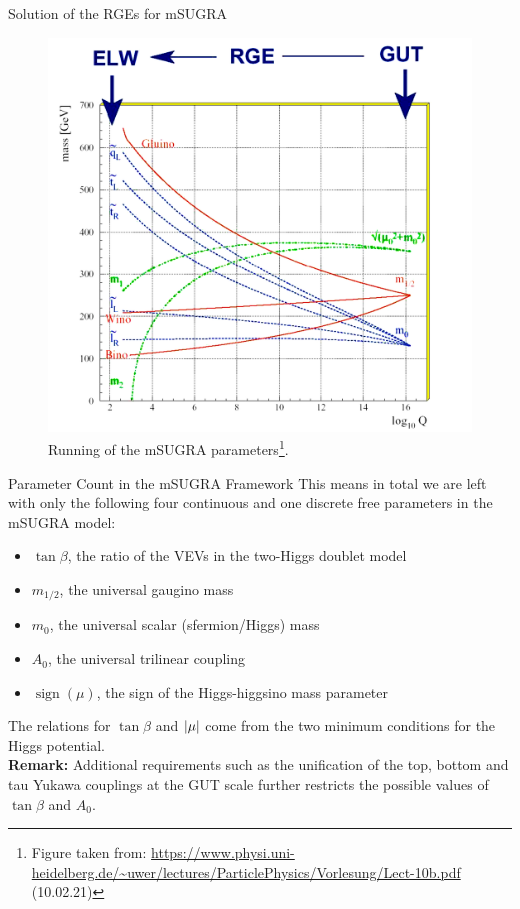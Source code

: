 \begin{frame}{Solution of the RGEs for mSUGRA}
	\begin{figure}
	\centering
	\includegraphics[scale = 0.75]{figures/mSUGRA_RGE}
	\caption{Running of the mSUGRA parameters\footnote{Figure taken from: \tiny\url{https://www.physi.uni-heidelberg.de/~uwer/lectures/ParticlePhysics/Vorlesung/Lect-10b.pdf} (10.02.21)}.}
	\end{figure}
\end{frame}
\begin{frame}{Parameter Count in the mSUGRA Framework}
This means in total we are left with only the following \alert{four continuous} and \alert{one discrete} free parameters in the mSUGRA model:\\[1em]

\begin{itemize}
	\item $\tan\beta$, the ratio of the VEVs in the two-Higgs doublet model\\[1em]
	\item $m_{1/2}$, the universal gaugino mass\\[1em]
	\item $m_{0}$, the universal scalar (sfermion/Higgs) mass\\[1em]
	\item $A_{0}$, the universal trilinear coupling\\[1em]
	\item $\operatorname{sign}(\mu)$, the sign of the Higgs-higgsino mass parameter\\[1em]
\end{itemize}
The relations for $\tan\beta$ and $\abs{\mu}$ come from the \alert{two minimum conditions} for the Higgs potential.\\[1em]
\textbf{Remark:} Additional requirements such as the unification of the top, bottom and tau Yukawa couplings at the GUT scale further restricts the possible values of $\tan\beta$ and $A_0$.
\end{frame}


